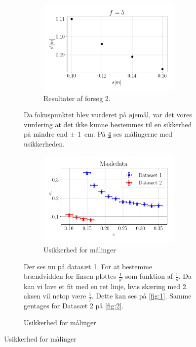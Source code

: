 \begin{table}[H]
\begin{figure}[H]
\begin{figure}[H]
\begin{figure}[H]
    \includegraphics[width=\linewidth]{res2.png}
    \caption{Resultater af forsøg 2.}
    \label{fig:res2}
\end{figure}
Da fokuspunktet blev vurderet på øjemål, var det vores vurdering at det ikke kunne bestemmes til en sikkerhed på mindre end $\pm $ \SI{1}{\centi\meter}. På \cref{fig:usikkerhed} ses målingerne med usikkerheden.
\begin{figure}[H]
    \includegraphics[width=\linewidth]{usikkerhed.png}
    \caption{Usikkerhed for målinger}
    \label{fig:usikkerhed}
\end{figure}
Der ses nu på datasæt 1. For at bestemme brændvidden for linsen plottes $\frac{1}{s'}$ som funktion af $\frac{1}{s}$. Da kan vi lave et fit med en ret linje, hvis skæring med 2. aksen vil netop være  $\frac{1}{f}$. Dette kan ses på \cref{fig:1}. Samme gentages for Datasæt 2 på \cref{fig:2}.

\end{figure}
\end{figure}
\end{table}
